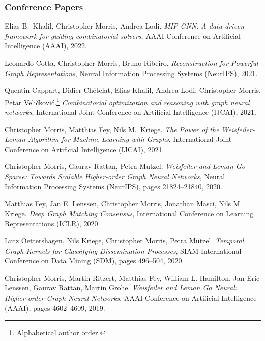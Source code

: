 \documentclass[11pt, a4paper, DIV=12]{scrartcl}
\begin{document}
\begin{thebibliography}{5}

\subsubsection*{Conference Papers}

	Elias B.\, Khalil, Christopher Morris, Andrea Lodi.
	\emph{MIP-GNN: A data-driven framework for guiding combinatorial solvers}, 
	 AAAI Conference on Artificial Intelligence (AAAI), 2022. 
	


    Leonardo Cotta, Christopher Morris, Bruno Ribeiro,
	\emph{Reconstruction for Powerful Graph Representations},
	Neural Information Processing Systems (NeurIPS), 2021.	

	Quentin Cappart, Didier Chételat, Elias Khalil, Andrea Lodi, Christopher Morris, Petar Veli\v{c}kovi\'{c}.\footnote[1]{Alphabetical author order.}
	\emph{Combinatorial optimization and reasoning with graph neural networks},
    International Joint Conference on Artificial Intelligence (IJCAI), 2021.	

	Christopher Morris, Matthias Fey, Nils M.~Kriege.
	\emph{The Power of the Weisfeiler-Leman Algorithm for Machine Learning with Graphs},
	International Joint Conference on Artificial Intelligence (IJCAI), 2021.

    Christopher Morris, Gaurav Rattan, Petra Mutzel.
	\emph{Weisfeiler and Leman Go Sparse: Towards Scalable Higher-order Graph Neural Networks},
	Neural Information Processing Systems (NeurIPS), pages 21824--21840, 2020.

	Matthias Fey, Jan E. Lenssen, Christopher Morris, Jonathan Masci, Nils M. Kriege.
    \emph{Deep Graph Matching Consensus},
	International Conference on Learning Representations (ICLR), 2020.
	
	Lutz Oettershagen, Nils Kriege, Christopher Morris, Petra Mutzel.
	\emph{Temporal Graph Kernels for Classifying Dissemination Processes},
	SIAM International Conference on Data Mining (SDM), pages 496--504, 2020.
	
	Christopher Morris, Martin Ritzert, Matthias Fey, William L. Hamilton, Jan Eric Lenssen, Gaurav Rattan, Martin Grohe.
	\newblock \emph{Weisfeiler and Leman Go Neural: Higher-order Graph Neural Networks},
	\newblock AAAI Conference on Artificial Intelligence (AAAI), pages 4602--4609, 2019.
	

\end{thebibliography}
\end{document}
